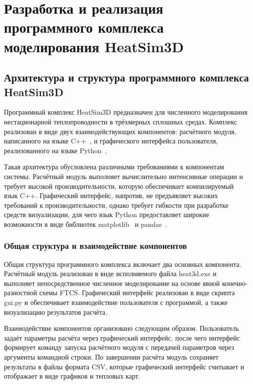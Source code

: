 \chapter{Разработка и реализация программного комплекса моделирования HeatSim3D}

\section{Архитектура и структура программного комплекса HeatSim3D}

Программный комплекс HeatSim3D предназначен для численного моделирования 
нестационарной теплопроводности в трёхмерных сплошных средах. Комплекс 
реализован в виде двух взаимодействующих компонентов: расчётного модуля, 
написанного на языке C++~\cite{stroustrup1986overview}, и графического интерфейса пользователя, 
реализованного на языке Python~\cite{python2021python}.

Такая архитектура обусловлена различными требованиями к компонентам 
системы. Расчётный модуль выполняет вычислительно интенсивные операции 
и требует высокой производительности, которую обеспечивает компилируемый 
язык C++. Графический интерфейс, напротив, не предъявляет высоких 
требований к производительности, однако требует гибкости при разработке 
средств визуализации, для чего язык Python предоставляет широкие 
возможности в виде библиотек matplotlib~\cite{bisong2019matplotlib} и pandas~\cite{robitaille2013astropy}.

\subsection{Общая структура и взаимодействие компонентов}

Общая структура программного комплекса включает два основных компонента. 
Расчётный модуль реализован в виде исполняемого файла heat3d.exe и 
выполняет непосредственное численное моделирование на основе явной 
конечно-разностной схемы FTCS. Графический интерфейс реализован в виде 
скрипта gui.py и обеспечивает взаимодействие пользователя с программой, 
а также визуализацию результатов расчёта.

Взаимодействие компонентов организовано следующим образом. Пользователь 
задаёт параметры расчёта через графический интерфейс, после чего 
интерфейс формирует команду запуска расчётного модуля с передачей 
параметров через аргументы командной строки. По завершении расчёта 
модуль сохраняет результаты в файлы формата CSV, которые графический 
интерфейс считывает и отображает в виде графиков и тепловых карт.

